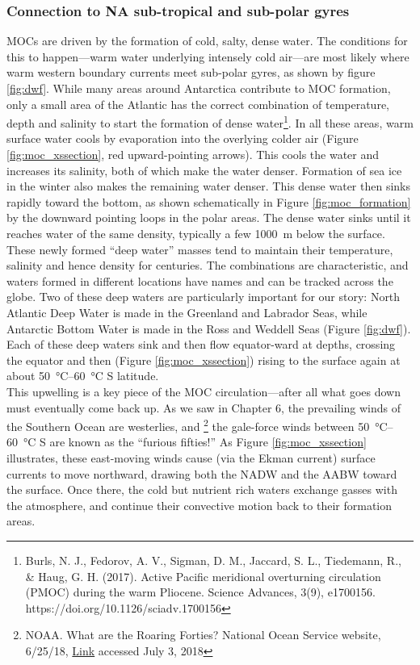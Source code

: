 \documentclass[amstex,12pt]{book}
\begin{document}
{\subsubsection{Connection to NA sub-tropical and sub-polar gyres}
MOCs are driven by the formation of cold, salty, dense water. The conditions for this to happen---warm water underlying intensely cold air---are most likely where warm western boundary currents meet sub-polar gyres, as shown by figure \ref{fig:dwf}. While many areas around Antarctica contribute to MOC formation, only a small area of the Atlantic has the correct combination of temperature, depth and salinity to start the formation of dense water\footnote{Burls, N. J., Fedorov, A. V., Sigman, D. M., Jaccard, S. L., Tiedemann, R., \& Haug, G. H. (2017). Active Pacific meridional overturning circulation (PMOC) during the warm Pliocene. Science Advances, 3(9), e1700156. https://doi.org/10.1126/sciadv.1700156}. In all these areas, warm surface water cools by evaporation into the overlying colder air (Figure \ref{fig:moc_xssection}, red upward-pointing arrows). This cools the water and increases its salinity, both of which make the water denser. Formation of sea ice in the winter also makes the remaining water denser. This dense water then sinks rapidly toward the bottom, as shown schematically in Figure \ref{fig:moc_formation} by the downward pointing loops in the polar areas. The dense water sinks until it reaches water of the same density, typically a few \SI{1000}{\metre} below the surface. These newly formed ``deep water'' masses tend to maintain their temperature, salinity and hence density for centuries. The combinations are characteristic, and waters formed in different locations have names and can be tracked across the globe. Two of these deep waters are particularly important for our story: North Atlantic Deep Water is made in the Greenland and Labrador Seas, while Antarctic Bottom Water is made in the Ross and Weddell Seas (Figure \ref{fig:dwf}). Each of these deep waters sink and then flow equator-ward at depths, crossing the equator and then (Figure \ref{fig:moc_xssection}) rising to the surface again at about \SIrange{50}{60}{\celsius} S latitude.\\
This upwelling is a key piece of the MOC circulation---after all what goes down must eventually come back up. As we saw in Chapter 6, the prevailing winds of the Southern Ocean are westerlies, and \footnote{NOAA. What are the Roaring Forties? National Ocean Service website, 6/25/18,  \href{https://oceanservice.noaa.gov/facts/roaring-forties.html}{Link} accessed July 3, 2018} the gale-force winds between \SIrange{50}{60}{\celsius} S are known as the ``furious fifties!'' As Figure \ref{fig:moc_xssection} illustrates, these east-moving winds cause (via the Ekman current) surface currents to move northward, drawing both the NADW and the AABW toward the surface. Once there, the cold but nutrient rich waters exchange gasses with the atmosphere, and continue their convective motion back to their formation areas. \\

}
\end{document}
